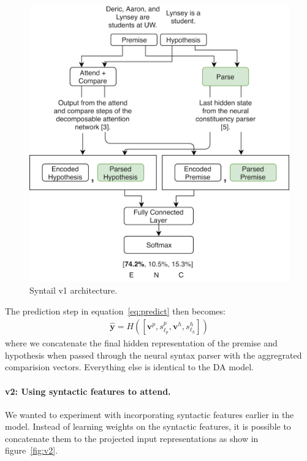 \documentclass[11pt,a4paper]{article}
\begin{document}
\begin{figure}[h]
    \centering
    \includegraphics[width=\linewidth]{figures/v1.png}
    \caption{Syntail v1 architecture.}
\label{fig:v1}
\end{figure}

The prediction step in equation~\ref{eq:predict} then becomes:
\begin{align}
    \hat{\bm{y}} = H([\bm{v}^p, s^p_{\ell_p}, \bm{v}^h, s^h_{\ell_h}])
\end{align}
where we concatenate the final hidden representation of the premise and hypothesis
when passed through the neural syntax parser with the aggregrated comparision vectors.
Everything else is identical to the DA model.

\paragraph{v2: Using syntactic features to attend.}
We wanted to experiment with incorporating syntactic features earlier in the model.
Instead of learning weights on the syntactic features, it is possible to
concatenate them to the projected input representations as show in figure~\ref{fig:v2}.
\end{document}
